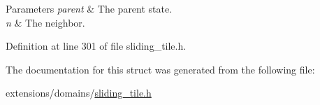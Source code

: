 \begin{DoxyParams}{Parameters}
{\em parent} & The parent state. \\
\hline
{\em n} & The neighbor. \\
\hline
\end{DoxyParams}


Definition at line 301 of file sliding\+\_\+tile.\+h.



The documentation for this struct was generated from the following file\+:\begin{DoxyCompactItemize}
\item 
extensions/domains/\hyperlink{sliding__tile_8h}{sliding\+\_\+tile.\+h}\end{DoxyCompactItemize}

